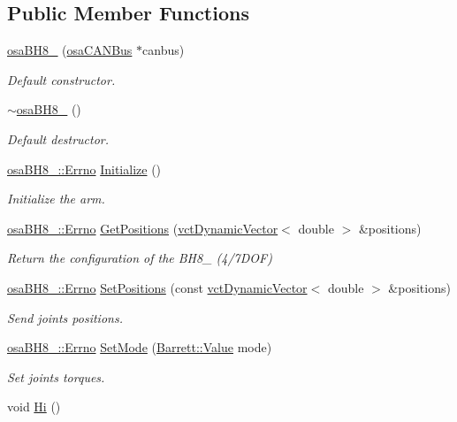 \subsection*{Public Member Functions}
\begin{DoxyCompactItemize}
\item 
\hyperlink{classosa_b_h8__280_a13a1d864a85c317b8a0ab2c39b9cc515}{osa\-B\-H8\-\_} (\hyperlink{classosa_c_a_n_bus}{osa\-C\-A\-N\-Bus} $\ast$canbus)
\begin{DoxyCompactList}\small\item\em Default constructor. \end{DoxyCompactList}\item 
\hyperlink{classosa_b_h8__280_ad48ec97fc8bdb4b2c0ce91b5569ce55a}{$\sim$osa\-B\-H8\-\_} ()
\begin{DoxyCompactList}\small\item\em Default destructor. \end{DoxyCompactList}\item 
\hyperlink{classosa_b_h8__280_ab8ba653b44589ea6165d12717ff97541}{osa\-B\-H8\-\_\-::\-Errno} \hyperlink{classosa_b_h8__280_aad206fdab519475fea24f9335861c447}{Initialize} ()
\begin{DoxyCompactList}\small\item\em Initialize the arm. \end{DoxyCompactList}\item 
\hyperlink{classosa_b_h8__280_ab8ba653b44589ea6165d12717ff97541}{osa\-B\-H8\-\_\-::\-Errno} \hyperlink{classosa_b_h8__280_a13b0d3632aa4f1868060ed65e31c1fbc}{Get\-Positions} (\hyperlink{classvct_dynamic_vector}{vct\-Dynamic\-Vector}$<$ double $>$ \&positions)
\begin{DoxyCompactList}\small\item\em Return the configuration of the B\-H8\-\_ (4/7\-D\-O\-F) \end{DoxyCompactList}\item 
\hyperlink{classosa_b_h8__280_ab8ba653b44589ea6165d12717ff97541}{osa\-B\-H8\-\_\-::\-Errno} \hyperlink{classosa_b_h8__280_a970f68ef50c92a9634f3a9ed89e64144}{Set\-Positions} (const \hyperlink{classvct_dynamic_vector}{vct\-Dynamic\-Vector}$<$ double $>$ \&positions)
\begin{DoxyCompactList}\small\item\em Send joints positions. \end{DoxyCompactList}\item 
\hyperlink{classosa_b_h8__280_ab8ba653b44589ea6165d12717ff97541}{osa\-B\-H8\-\_\-::\-Errno} \hyperlink{classosa_b_h8__280_a567fdc2413e6066147e25135687f6fcb}{Set\-Mode} (\hyperlink{struct_barrett_a57ff132885344ca62e4b4b691885685b}{Barrett\-::\-Value} mode)
\begin{DoxyCompactList}\small\item\em Set joints torques. \end{DoxyCompactList}\item 
void \hyperlink{classosa_b_h8__280_a1a5810b25b84091828e36ee9eb14228f}{Hi} ()
\end{DoxyCompactItemize}


